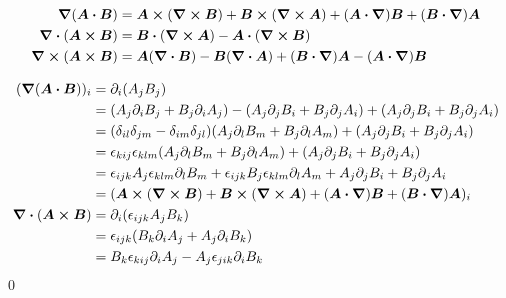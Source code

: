 \documentclass[uplatex,dvipdfmx,a4paper,11pt]{jlreq}
\makeatletter
\newcommand{\rot}{\curl}
\theoremstyle{definition}
\renewenvironment{proof}[1][\proofname]{\par
  \normalfont
  \topsep6\p@\@plus6\p@ \trivlist
  \item[\hskip\labelsep{\bfseries #1}\@addpunct{\bfseries}]\ignorespaces\quad\par
}{%
  \qed\endtrivlist\@endpefalse
}
\renewcommand\proofname{証明}
\makeatother
\begin{document}
\begin{theorem}
  \begin{align}
    \grad{(\bm{A}\vdot\bm{B})} & = \bm{A}\cross(\rot{\bm{B}}) + \bm{B}\cross(\rot{\bm{A}}) + (\bm{A}\vdot\vnabla)\bm{B} + (\bm{B}\vdot\vnabla)\bm{A} \\
    \div{(\bm{A}\cross\bm{B})} & = \bm{B}\vdot(\rot{\bm{A}}) - \bm{A}\vdot(\rot{\bm{B}})                                                             \\
    \rot{(\bm{A}\cross\bm{B})} & = \bm{A}(\div{\bm{B}}) - \bm{B}(\div{\bm{A}}) + (\bm{B}\vdot\vnabla)\bm{A} - (\bm{A}\vdot\vnabla)\bm{B}
  \end{align}
\end{theorem}
\begin{proof}
  \begin{align}
    (\grad{(\bm{A}\vdot\bm{B})})_i & = \partial_i(A_jB_j)                                                                                                                \\
                                   & = (A_j\partial_iB_j + B_j\partial_iA_j) - (A_j\partial_jB_i + B_j\partial_jA_i) + (A_j\partial_jB_i + B_j\partial_jA_i)             \\
                                   & = (\delta_{il}\delta_{jm} - \delta_{im}\delta_{jl})(A_j\partial_lB_m + B_j\partial_lA_m) + (A_j\partial_jB_i + B_j\partial_jA_i)    \\
                                   & = \epsilon_{kij}\epsilon_{klm}(A_j\partial_lB_m + B_j\partial_lA_m) + (A_j\partial_jB_i + B_j\partial_jA_i)                         \\
                                   & = \epsilon_{ijk}A_j\epsilon_{klm}\partial_lB_m + \epsilon_{ijk}B_j\epsilon_{klm}\partial_lA_m + A_j\partial_jB_i + B_j\partial_jA_i \\
                                   & = (\bm{A}\cross(\rot{\bm{B}}) + \bm{B}\cross(\rot{\bm{A}}) + (\bm{A}\vdot\vnabla)\bm{B} + (\bm{B}\vdot\vnabla)\bm{A})_i             \\
    \div{(\bm{A}\cross\bm{B})}     & = \partial_i(\epsilon_{ijk}A_jB_k)                                                                                                  \\
                                   & = \epsilon_{ijk}(B_k\partial_iA_j + A_j\partial_iB_k)                                                                               \\
                                   & = B_k\epsilon_{kij}\partial_iA_j - A_j\epsilon_{jik}\partial_iB_k                                                                   \\

\end{align}
\end{proof}
\end{document}
